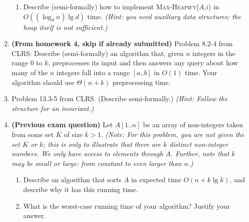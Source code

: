 \documentclass[letterpaper,11pt]{article}
\begin{document}
\begin{enumerate}
\begin{enumerate}
\item Describe (semi-formally) how to implement \textsc{Max-Heapify}($A$,$i$) in $O((\log_dn)\lg d)$ time. \emph{(Hint: you need auxiliary data structures; the heap itself is not sufficient.)}
\end{enumerate}

\item \textbf{(From homework 4, skip if already submitted)} Problem 8.2-4 from CLRS: Describe (semi-formally) an algorithm that, given $n$ integers in the range $0$ to $k$, preprocesses its input and then answers any query about how many of the $n$ integers fall into a range $[a..b]$ in $O(1)$ time. Your algorithm should use $\Theta(n + k)$ preprocessing time.

\item Problem 13.3-5 from CLRS. (Describe semi-formally.) \emph{(Hint: Follow the structure for an invariant.)}

\item \textbf{(Previous exam question)} Let $A[1..n]$ be an array of non-integers taken from some set $K$ of size $k>1$. \emph{(Note: For this problem, you are not given the set $K$ or $k$; this is only to illustrate that there are $k$ distinct non-integer numbers. We only have access to elements through $A$. Further, note that $k$ may be small or large: from constant to even larger than $n$.)}
\begin{enumerate}
\item Describe an algorithm that sorts $A$ in expected time $O(n + k\lg k)$, and describe why it has this running time. 

\item What is the worst-case running time of your algorithm? Justify your answer.
\end{enumerate}

\end{enumerate}
\end{document}
